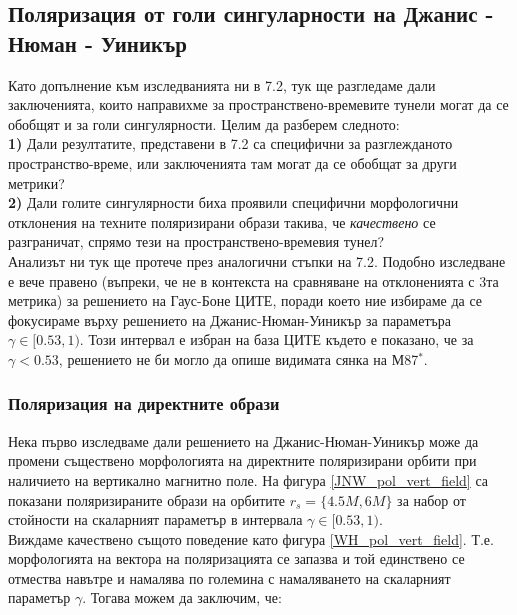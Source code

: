 \subsection{Поляризация от голи сингуларности на Джанис - Нюман - Уиникър}

Като допълнение към изследванията ни в 7.2, тук ще разгледаме дали заключенията, които направихме за пространствено-времевите тунели могат да се обобщят и за голи сингулярности. Целим да разберем следното:\\

\textbf{1)} Дали резултатите, представени в 7.2 са специфични за разглежданото пространство-време, или заключенията там могат да се обобщат за други метрики?\\

\textbf{2)} Дали голите сингулярности биха проявили специфични морфологични отклонения на техните поляризирани образи такива, че \emph{качествено} се разграничат, спрямо тези на пространствено-времевия тунел?\\

Анализът ни тук ще протече през аналогични стъпки на 7.2. Подобно изследване е вече правено (въпреки, че не в контекста на сравняване на отклоненията с 3та метрика) за решението на Гаус-Боне ЦИТЕ, поради което ние избираме да се фокусираме върху решението на Джанис-Нюман-Уиникър за параметъра $\gamma \in [0.53, 1)$. Този интервал е избран на база ЦИТЕ където е показано, че за $\gamma < 0.53$, решението не би могло да опише видимата сянка на М87$^*$. 

\subsubsection{Поляризация на директните образи}

Нека първо изследваме дали решението на Джанис-Нюман-Уиникър може да промени съществено морфологията на директните поляризирани орбити при наличието на вертикално магнитно поле. На фигура \ref{JNW_pol_vert_field} са показани поляризираните образи на орбитите $r_s = \{4.5M,6M\}$ за набор от стойности на скаларният параметър в интервала $\gamma\in[0.53,1)$.\\

Виждаме качествено същото поведение като фигура \ref{WH_pol_vert_field}. Т.е. морфологията на вектора на поляризацията се запазва и той единствено се отмества навътре и намалява по големина с намаляването на скаларният параметър $\gamma$. Тогава можем да заключим, че:\\

